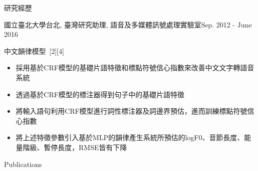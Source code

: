 \documentclass{resume} %
\begin{document}
\begin{rSection}{研究經歷}
\begin{rSubsection}{國立臺北大學}{台北, 臺灣}{研究助理, 語音及多媒體訊號處理實驗室}{Sep. 2012 - June 2016}
\begin{itemize}[label=$-$]
        \end{itemize}\vspace{0.5em}
        \item 中文韻律模型~[2][4]
        \begin{itemize}[label=$-$]
            \setlength \itemsep{-0.5em}
            \item 採用基於CRF模型的基礎片語特徵和標點符號信心指數來改善中文文字轉語音系統
            \item 透過基於CRF模型的標注器得到句子中的基礎片語特徵
            \item 將輸入語句利用CRF模型進行詞性標注器及詞邊界預估，進而訓練標點符號信心指數
            \item 將上述特徵參數引入基於MLP的韻律產生系統所預估的logF0、音節長度、能量階級、暫停長度，RMSE皆有下降
        \end{itemize}\vspace{0.5em}
    \end{rSubsection}
\end{rSection}

\begin{rSection}{Publications}
    
    
    \begin{enumerate}[label={[\arabic*]}]
    \item {}
    \item {}
    \item {}
    \item {}
    \end{enumerate}    
\end{rSection}

\end{document}
